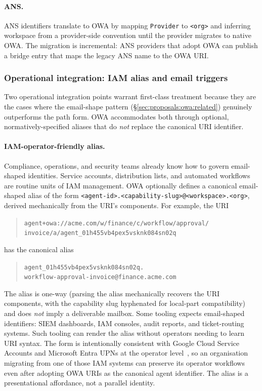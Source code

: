 \paragraph{ANS.}
ANS identifiers translate to OWA by mapping
\texttt{Provider} to \texttt{<org>} and inferring
workspace from a provider-side convention until the
provider migrates to native OWA. The migration is
incremental: ANS providers that adopt OWA can publish a
bridge entry that maps the legacy ANS name to the OWA
URI.

\subsubsection{Operational integration: IAM alias and email triggers}
\label{sec:proposals:owa:operational}

Two operational integration points warrant first-class
treatment because they are the cases where the
email-shape pattern (\S\ref{sec:proposals:owa:related})
genuinely outperforms the path form. OWA accommodates both
through optional, normatively-specified aliases that do
\emph{not} replace the canonical URI identifier.

\paragraph{IAM-operator-friendly alias.}
Compliance, operations, and security teams already know
how to govern email-shaped identities. Service
accounts, distribution lists, and automated workflows are
routine units of IAM management. OWA optionally defines a
canonical email-shaped alias of the form
\texttt{<agent-id>.<capability-slug>@<workspace>.<org>},
derived mechanically from the URI's components. For
example, the URI

\begin{quote}
\texttt{agent+owa://acme.com/w/finance/c/workflow/approval/}\\
\texttt{invoice/a/agent\_01h455vb4pex5vsknk084sn02q}
\end{quote}

\noindent has the canonical alias

\begin{quote}
\texttt{agent\_01h455vb4pex5vsknk084sn02q.}\\
\texttt{workflow-approval-invoice@finance.acme.com}
\end{quote}

The alias is one-way (parsing the alias mechanically
recovers the URI components, with the capability slug
hyphenated for local-part compatibility) and does
\emph{not} imply a deliverable mailbox. Some tooling
expects email-shaped identifiers: SIEM dashboards,
IAM consoles, audit reports, and ticket-routing systems.
Such tooling can render the alias without operators
needing to learn URI syntax. The form is intentionally consistent with
Google Cloud Service Accounts and Microsoft Entra UPNs
at the operator level~\cite{gcp_service_accounts,
entra_service_principals}, so an organisation migrating
from one of those IAM systems can preserve its operator
workflows even after adopting OWA URIs as the canonical
agent identifier. The alias is a presentational
affordance, not a parallel identity.

